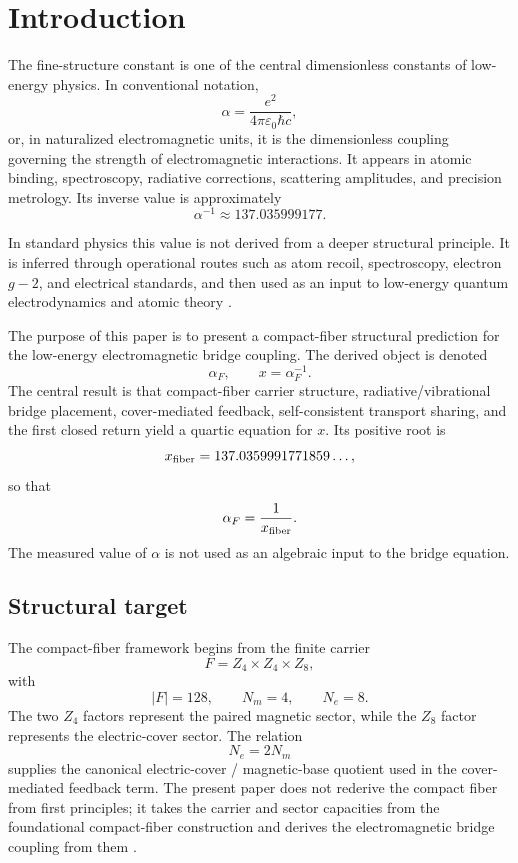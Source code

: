 \section{Introduction}

The fine-structure constant is one of the central dimensionless constants
of low-energy physics. In conventional notation,
\[
\alpha=\frac{e^2}{4\pi\varepsilon_0\hbar c},
\]
or, in naturalized electromagnetic units, it is the dimensionless
coupling governing the strength of electromagnetic interactions. It
appears in atomic binding, spectroscopy, radiative corrections,
scattering amplitudes, and precision metrology. Its inverse value is
approximately
\[
\alpha^{-1}\approx 137.035999177.
\]

In standard physics this value is not derived from a deeper structural
principle. It is inferred through operational routes such as atom recoil,
spectroscopy, electron \(g-2\), and electrical standards, and then used
as an input to low-energy quantum electrodynamics and atomic theory
\cite{NIST_CODATA_2022_alpha_inv,Parker2018_alpha_Cs,
Morel2020_alpha_Rb,Aoyama2019_electron_gminus2_review,
BIPM_SI_Brochure_9th}.

The purpose of this paper is to present a compact-fiber structural
prediction for the low-energy electromagnetic bridge coupling. The
derived object is denoted
\[
\alpha_F,
\qquad
x=\alpha_F^{-1}.
\]
The central result is that compact-fiber carrier structure,
radiative/vibrational bridge placement, cover-mediated feedback,
self-consistent transport sharing, and the first closed return yield a
quartic equation for \(x\). Its positive root is
\[
x_{\rm fiber}=137.0359991771859\ldots,
\]
so that
\[
\alpha_F=\frac{1}{x_{\rm fiber}}.
\]
The measured value of \(\alpha\) is not used as an algebraic input to
the bridge equation.

\subsection{Structural target}

The compact-fiber framework begins from the finite carrier
\[
F=Z_4\times Z_4\times Z_8,
\]
with
\[
|F|=128,
\qquad
N_m=4,
\qquad
N_e=8.
\]
The two \(Z_4\) factors represent the paired magnetic sector, while the
\(Z_8\) factor represents the electric-cover sector. The relation
\[
N_e=2N_m
\]
supplies the canonical electric-cover / magnetic-base quotient used in
the cover-mediated feedback term. The present paper does not rederive
the compact fiber from first principles; it takes the carrier and sector
capacities from the foundational compact-fiber construction and derives
the electromagnetic bridge coupling from them
\cite{Wells2026PaperI,Wells2026PaperII,Wells2026PaperIII}.

